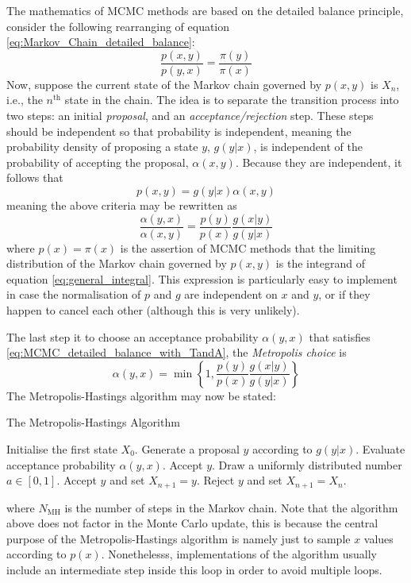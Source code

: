 \documentclass[nofootinbib,reprint,english]{revtex4-1}
\begin{document}
The mathematics of MCMC methods are based on the detailed balance principle, consider the following rearranging of equation \eqref{eq:Markov_Chain_detailed_balance}:
\[\frac{p(x,y)}{p(y,x)}=\frac{\pi(y)}{\pi(x)}\]
Now, suppose the current state of the Markov chain governed by \(p(x,y)\) is \(X_n\), i.e., the \(n^\text{th}\) state in the chain. The idea is to separate the transition process into two steps: an initial \emph{proposal}, and an \emph{acceptance/rejection} step. These steps should be independent so that probability is independent, meaning the probability density of proposing a state \(y\), \(g(y|x)\), is independent of the probability of accepting the proposal, \(\alpha(x,y)\). Because they are independent, it follows that
\begin{equation}
p(x,y)=g(y|x)\alpha(x,y)
\end{equation}
meaning the above criteria may be rewritten as
\begin{equation}\label{eq:MCMC_detailed_balance_with_TandA}
\frac{\alpha(y,x)}{\alpha(x,y)}=\frac{p(y)}{p(x)}\frac{g(x|y)}{g(y|x)}
\end{equation}
where \(p(x)=\pi(x)\) is the assertion of MCMC methods that the limiting distribution of the Markov chain governed by \(p(x,y)\) is the integrand of equation \eqref{eq:general_integral}. This expression is particularly easy to implement in case the normalisation of \(p\) and \(g\) are independent on \(x\) and \(y\), or if they happen to cancel each other (although this is very unlikely).

The last step it to choose an acceptance probability \(\alpha(y,x)\) that satisfies \ref{eq:MCMC_detailed_balance_with_TandA}, the \emph{Metropolis choice} is
\begin{equation}\label{eq:Metropolis_Hastings_acceptance_probability}
\alpha(y,x)=\min\left\lbrace 1,\frac{p(y)}{p(x)}\frac{g(x|y)}{g(y|x)}\right\rbrace
\end{equation}
The Metropolis-Hastings algorithm may now be stated:
\begin{algorithm}[H]
\caption{The Metropolis-Hastings Algorithm}\label{algo:Metropolis_Hastings}
\begin{algorithmic}[1]
\State Initialise the first state \(X_0\).
	\State Generate a proposal \(y\) according to \(g(y|x)\).
	\State Evaluate acceptance probability \(\alpha(y,x)\).
		\State Accept \(y\).
	\Else
		\State Draw a uniformly distributed number \(a\in[0,1]\).
			\State Accept \(y\) and set \(X_{n+1}=y\).
		\Else
			\State Reject \(y\) and set \(X_{n+1}=X_n\).
		\EndIf
	\EndIf
\EndFor
\end{algorithmic}
\end{algorithm}
where \(N_\text{MH}\) is the number of steps in the Markov chain. Note that the algorithm above does not factor in the Monte Carlo update, this is because the central purpose of the Metropolis-Hastings algorithm is namely just to sample \(x\) values according to \(p(x)\). Nonethelesss, implementations of the algorithm usually include an intermediate step inside this loop in order to avoid multiple loops.
\end{document}
